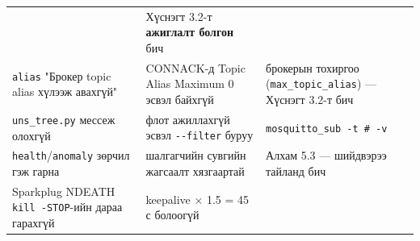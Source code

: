 \begin{longtable}[]{@{}lll@{}}
\begin{minipage}[t]{0.30\columnwidth}
\end{minipage} & \begin{minipage}[t]{0.30\columnwidth}\raggedright
Хүснэгт 3.2-т \textbf{ажиглалт болгон} бич\strut
\end{minipage}\tabularnewline
\begin{minipage}[t]{0.30\columnwidth}\raggedright
\texttt{alias} "Брокер topic alias хүлээж авахгүй"\strut
\end{minipage} & \begin{minipage}[t]{0.30\columnwidth}\raggedright
CONNACK-д Topic Alias Maximum 0 эсвэл байхгүй\strut
\end{minipage} & \begin{minipage}[t]{0.30\columnwidth}\raggedright
брокерын тохиргоо (\texttt{max\_\allowbreak{}topic\_\allowbreak{}alias}) --- Хүснэгт 3.2-т бич\strut
\end{minipage}\tabularnewline
\begin{minipage}[t]{0.30\columnwidth}\raggedright
\texttt{uns\_tree.py} мессеж олохгүй\strut
\end{minipage} & \begin{minipage}[t]{0.30\columnwidth}\raggedright
флот ажиллахгүй эсвэл \texttt{-\/-filter} буруу\strut
\end{minipage} & \begin{minipage}[t]{0.30\columnwidth}\raggedright
\texttt{mosquitto\_sub\ -t\ \textquotesingle{}\#\textquotesingle{}\ -v}\strut
\end{minipage}\tabularnewline
\begin{minipage}[t]{0.30\columnwidth}\raggedright
\texttt{health}/\allowbreak\texttt{anomaly} зөрчил гэж гарна\strut
\end{minipage} & \begin{minipage}[t]{0.30\columnwidth}\raggedright
шалгагчийн сувгийн жагсаалт хязгаартай\strut
\end{minipage} & \begin{minipage}[t]{0.30\columnwidth}\raggedright
Алхам 5.3 --- шийдвэрээ тайланд бич\strut
\end{minipage}\tabularnewline
\begin{minipage}[t]{0.30\columnwidth}\raggedright
Sparkplug NDEATH \texttt{kill\ -STOP}-ийн дараа гарахгүй\strut
\end{minipage} & \begin{minipage}[t]{0.30\columnwidth}\raggedright
keepalive × 1.5 = 45 с болоогүй\strut
\end{minipage} & \begin{minipage}[t]{0.30\columnwidth}\raggedright

\end{minipage}
\end{longtable}
